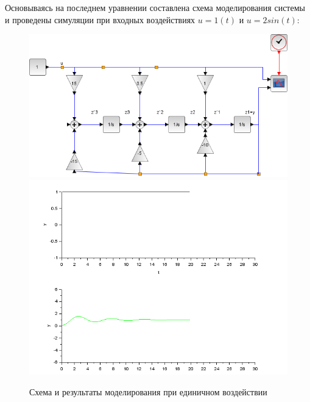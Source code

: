 \documentclass[a4paper,12pt,russian]{article} %
\begin{document}
Основываясь на последнем уравнении составлена схема моделирования системы и проведены симуляции при входных воздействиях $u=1(t)$ и $u=2sin(t)$:\\ 
\begin{figure}[H]
	\includegraphics[width=1\textwidth]{вход-выход-схема}
	\includegraphics[width=1\textwidth]{вход-выход-1}
	\caption{Схема и результаты моделирования при единичном воздействии}
\end{figure}
\end{document}
